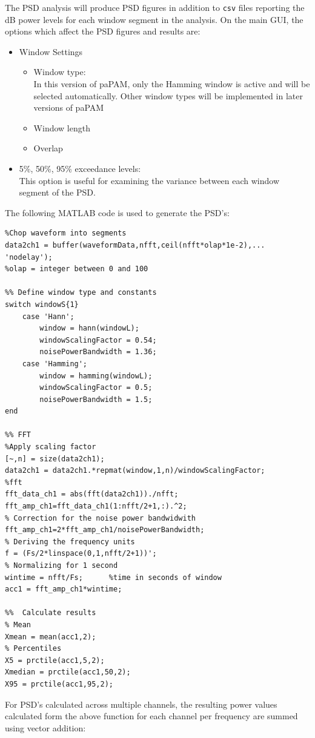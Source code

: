 \documentclass[11pt]{report}
\begin{document}
The PSD analysis will produce PSD figures in addition to \texttt{csv} files reporting the dB power levels for each window segment in the analysis.  On the main GUI, the options which affect the PSD figures and results are:
\begin{itemize}
\item Window Settings
\begin{itemize}
\item Window type:\\
In this version of paPAM, only the Hamming window is active and will be selected automatically.  Other window types will be implemented in later versions of paPAM
\item Window length
\item Overlap
\end{itemize}
\item 5\%, 50\%, 95\% exceedance levels:\\
This option is useful for examining the variance between each window segment of the PSD.
\end{itemize}

The following MATLAB code is used to generate the PSD's:

\begin{lstlisting}
%Chop waveform into segments
data2ch1 = buffer(waveformData,nfft,ceil(nfft*olap*1e-2),...
'nodelay');
%olap = integer between 0 and 100

%% Define window type and constants
switch windowS{1}
	case 'Hann';
    	window = hann(windowL);
		windowScalingFactor = 0.54;
		noisePowerBandwidth = 1.36;
	case 'Hamming';
		window = hamming(windowL);
		windowScalingFactor = 0.5;
		noisePowerBandwidth = 1.5;
end

%% FFT
%Apply scaling factor
[~,n] = size(data2ch1);
data2ch1 = data2ch1.*repmat(window,1,n)/windowScalingFactor;
%fft
fft_data_ch1 = abs(fft(data2ch1))./nfft;
fft_amp_ch1=fft_data_ch1(1:nfft/2+1,:).^2;
% Correction for the noise power bandwidwith
fft_amp_ch1=2*fft_amp_ch1/noisePowerBandwidth;
% Deriving the frequency units
f = (Fs/2*linspace(0,1,nfft/2+1))';
% Normalizing for 1 second
wintime = nfft/Fs;      %time in seconds of window
acc1 = fft_amp_ch1*wintime;

%%  Calculate results
% Mean
Xmean = mean(acc1,2);
% Percentiles
X5 = prctile(acc1,5,2);
Xmedian = prctile(acc1,50,2);
X95 = prctile(acc1,95,2);
\end{lstlisting}

For PSD's calculated across multiple channels, the resulting power values calculated form the above function for each channel per frequency are summed using vector addition: \\
\end{document}
